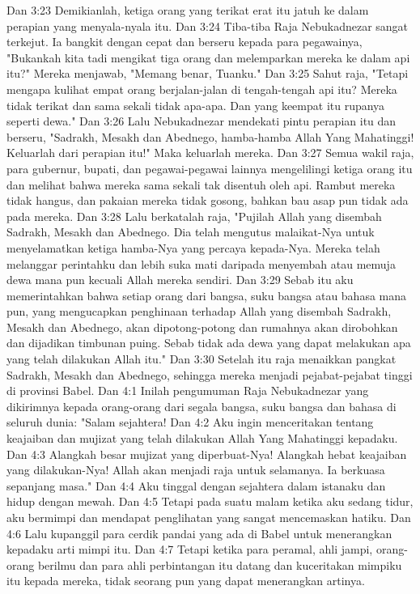 Dan 3:23  Demikianlah, ketiga orang yang terikat erat itu jatuh ke dalam perapian yang menyala-nyala itu.
Dan 3:24  Tiba-tiba Raja Nebukadnezar sangat terkejut. Ia bangkit dengan cepat dan berseru kepada para pegawainya, "Bukankah kita tadi mengikat tiga orang dan melemparkan mereka ke dalam api itu?" Mereka menjawab, "Memang benar, Tuanku."
Dan 3:25  Sahut raja, "Tetapi mengapa kulihat empat orang berjalan-jalan di tengah-tengah api itu? Mereka tidak terikat dan sama sekali tidak apa-apa. Dan yang keempat itu rupanya seperti dewa."
Dan 3:26  Lalu Nebukadnezar mendekati pintu perapian itu dan berseru, "Sadrakh, Mesakh dan Abednego, hamba-hamba Allah Yang Mahatinggi! Keluarlah dari perapian itu!" Maka keluarlah mereka.
Dan 3:27  Semua wakil raja, para gubernur, bupati, dan pegawai-pegawai lainnya mengelilingi ketiga orang itu dan melihat bahwa mereka sama sekali tak disentuh oleh api. Rambut mereka tidak hangus, dan pakaian mereka tidak gosong, bahkan bau asap pun tidak ada pada mereka.
Dan 3:28  Lalu berkatalah raja, "Pujilah Allah yang disembah Sadrakh, Mesakh dan Abednego. Dia telah mengutus malaikat-Nya untuk menyelamatkan ketiga hamba-Nya yang percaya kepada-Nya. Mereka telah melanggar perintahku dan lebih suka mati daripada menyembah atau memuja dewa mana pun kecuali Allah mereka sendiri.
Dan 3:29  Sebab itu aku memerintahkan bahwa setiap orang dari bangsa, suku bangsa atau bahasa mana pun, yang mengucapkan penghinaan terhadap Allah yang disembah Sadrakh, Mesakh dan Abednego, akan dipotong-potong dan rumahnya akan dirobohkan dan dijadikan timbunan puing. Sebab tidak ada dewa yang dapat melakukan apa yang telah dilakukan Allah itu."
Dan 3:30  Setelah itu raja menaikkan pangkat Sadrakh, Mesakh dan Abednego, sehingga mereka menjadi pejabat-pejabat tinggi di provinsi Babel.
Dan 4:1  Inilah pengumuman Raja Nebukadnezar yang dikirimnya kepada orang-orang dari segala bangsa, suku bangsa dan bahasa di seluruh dunia: "Salam sejahtera!
Dan 4:2  Aku ingin menceritakan tentang keajaiban dan mujizat yang telah dilakukan Allah Yang Mahatinggi kepadaku.
Dan 4:3  Alangkah besar mujizat yang diperbuat-Nya! Alangkah hebat keajaiban yang dilakukan-Nya! Allah akan menjadi raja untuk selamanya. Ia berkuasa sepanjang masa."
Dan 4:4  Aku tinggal dengan sejahtera dalam istanaku dan hidup dengan mewah.
Dan 4:5  Tetapi pada suatu malam ketika aku sedang tidur, aku bermimpi dan mendapat penglihatan yang sangat mencemaskan hatiku.
Dan 4:6  Lalu kupanggil para cerdik pandai yang ada di Babel untuk menerangkan kepadaku arti mimpi itu.
Dan 4:7  Tetapi ketika para peramal, ahli jampi, orang-orang berilmu dan para ahli perbintangan itu datang dan kuceritakan mimpiku itu kepada mereka, tidak seorang pun yang dapat menerangkan artinya.
